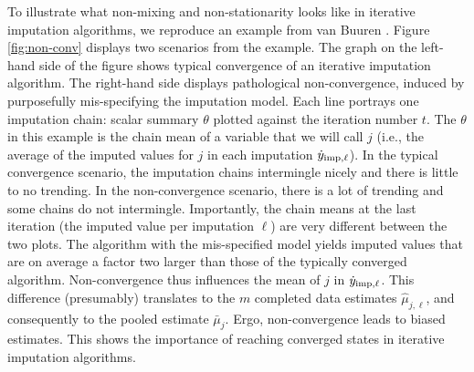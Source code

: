 \documentclass[Royal,times,sageh]{sagej}
\begin{document}
To illustrate what non-mixing and non-stationarity looks like in iterative imputation algorithms, we reproduce an example from van Buuren \citeyearpar[\(\S\) 6.5.2]{buur18}. Figure \ref{fig:non-conv} displays two scenarios from the example. The graph on the left-hand side of the figure shows typical convergence of an iterative imputation algorithm. The right-hand side displays pathological non-convergence, induced by purposefully mis-specifying the imputation model. Each line portrays one imputation chain: scalar summary \(\theta\) plotted against the iteration number \(t\). The \(\theta\) in this example is the chain mean of a variable that we will call \(j\) (i.e., the average of the imputed values for \(j\) in each imputation \(\dot y_{\rm imp, \ell}\)). In the typical convergence scenario, the imputation chains intermingle nicely and there is little to no trending. In the non-convergence scenario, there is a lot of trending and some chains do not intermingle. Importantly, the chain means at the last iteration (the imputed value per imputation \(\ell\)) are very different between the two plots. The algorithm with the mis-specified model yields imputed values that are on average a factor two larger than those of the typically converged algorithm. Non-convergence thus influences the mean of \(j\) in \(\dot y_{\rm imp, \ell}\). This difference (presumably) translates to the \(m\) completed data estimates \(\hat{\mu}_{j,\ell}\), and consequently to the pooled estimate \(\bar{\mu}_j\). Ergo, non-convergence leads to biased estimates. This shows the importance of reaching converged states in iterative imputation algorithms.
\end{document}
